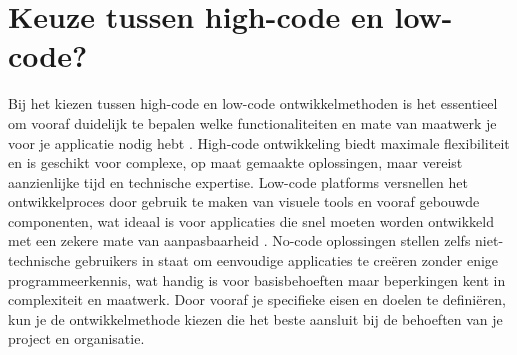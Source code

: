 \section{Keuze tussen high-code en low-code?}
Bij het kiezen tussen high-code en low-code ontwikkelmethoden is het essentieel om vooraf duidelijk te bepalen welke functionaliteiten en mate van maatwerk je voor je applicatie nodig hebt \autocite{Ballejos2024}. High-code ontwikkeling biedt maximale flexibiliteit en is geschikt voor complexe, op maat gemaakte oplossingen, maar vereist aanzienlijke tijd en technische expertise. Low-code platforms versnellen het ontwikkelproces door gebruik te maken van visuele tools en vooraf gebouwde componenten, wat ideaal is voor applicaties die snel moeten worden ontwikkeld met een zekere mate van aanpasbaarheid \autocite{Ballejos2024}. No-code oplossingen stellen zelfs niet-technische gebruikers in staat om eenvoudige applicaties te creëren zonder enige programmeerkennis, wat handig is voor basisbehoeften maar beperkingen kent in complexiteit en maatwerk. Door vooraf je specifieke eisen en doelen te definiëren, kun je de ontwikkelmethode kiezen die het beste aansluit bij de behoeften van je project en organisatie.


